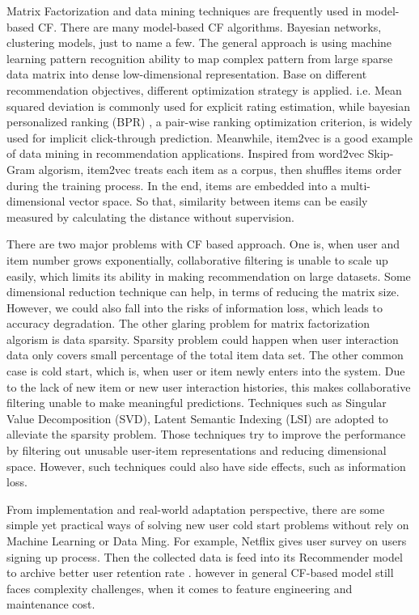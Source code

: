 Matrix Factorization and data mining techniques are frequently used in model-based CF. There are many model-based CF algorithms. Bayesian networks, clustering models, just to name a few. The general approach is using machine learning pattern recognition ability to map complex pattern from large sparse data matrix into dense low-dimensional representation. Base on different recommendation objectives, different optimization strategy is applied. i.e. Mean squared deviation is commonly used for explicit rating estimation, while bayesian personalized ranking (BPR) \citep{rendle2012bpr}, a pair-wise ranking optimization criterion, is widely used for implicit click-through prediction.   
Meanwhile, item2vec \citep{barkan2016item2vec} is a good example of data mining in recommendation applications. Inspired from word2vec \citep{mikolov2013distributed} Skip-Gram algorism, item2vec treats each item as a corpus, then shuffles items order during the training process. In the end, items are embedded into a multi-dimensional vector space. So that, similarity between items can be easily measured by calculating the distance without supervision.  

There are two major problems with CF based approach.  
One is, when user and item number grows exponentially, collaborative filtering is unable to scale up easily, which limits its ability in making recommendation on large datasets. Some dimensional reduction technique can help, in terms of reducing the matrix size. However, we could also fall into the risks of information loss, which leads to accuracy degradation. 
The other glaring problem for matrix factorization algorism is data sparsity. Sparsity problem could happen when user interaction data only covers small percentage of the total item data set. The other common case is cold start, which is, when user or item newly enters into the system. Due to the lack of new item or new user interaction histories, this makes collaborative filtering unable to make meaningful predictions.  
Techniques such as Singular Value Decomposition (SVD), Latent Semantic Indexing (LSI) are adopted to alleviate the sparsity problem. Those techniques try to improve the performance by filtering out unusable user-item representations and reducing dimensional space. However, such techniques could also have side effects, such as information loss. 

From implementation and real-world adaptation perspective, there are some simple yet practical ways of solving new user cold start problems without rely on Machine Learning or Data Ming. For example, Netflix gives user survey on users signing up process. Then the collected data is feed into its Recommender model to archive better user retention rate \citep{gomez2015netflix}. however in general CF-based model still faces complexity challenges, when it comes to feature engineering and maintenance cost. 


